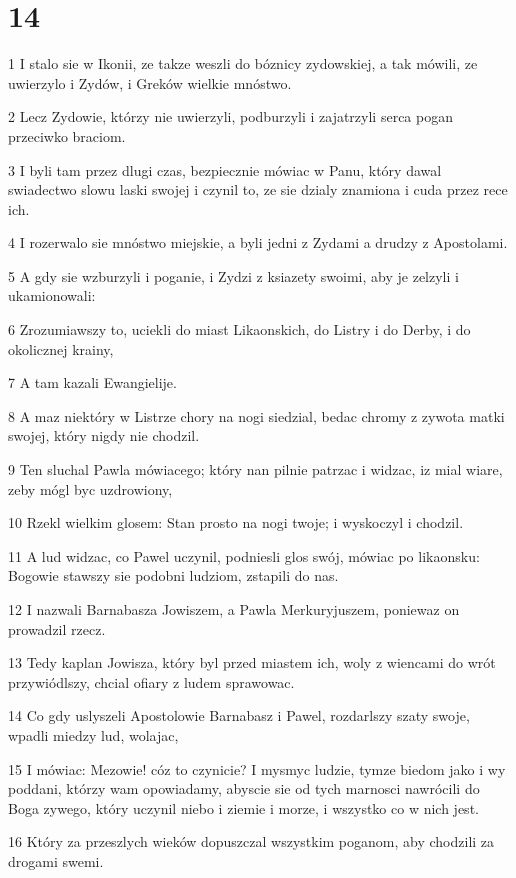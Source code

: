 \chapter{14}

\par 1 I stalo sie w Ikonii, ze takze weszli do bóznicy zydowskiej, a tak mówili, ze uwierzylo i Zydów, i Greków wielkie mnóstwo.
\par 2 Lecz Zydowie, którzy nie uwierzyli, podburzyli i zajatrzyli serca pogan przeciwko braciom.
\par 3 I byli tam przez dlugi czas, bezpiecznie mówiac w Panu, który dawal swiadectwo slowu laski swojej i czynil to, ze sie dzialy znamiona i cuda przez rece ich.
\par 4 I rozerwalo sie mnóstwo miejskie, a byli jedni z Zydami a drudzy z Apostolami.
\par 5 A gdy sie wzburzyli i poganie, i Zydzi z ksiazety swoimi, aby je zelzyli i ukamionowali:
\par 6 Zrozumiawszy to, uciekli do miast Likaonskich, do Listry i do Derby, i do okolicznej krainy,
\par 7 A tam kazali Ewangielije.
\par 8 A maz niektóry w Listrze chory na nogi siedzial, bedac chromy z zywota matki swojej, który nigdy nie chodzil.
\par 9 Ten sluchal Pawla mówiacego; który nan pilnie patrzac i widzac, iz mial wiare, zeby mógl byc uzdrowiony,
\par 10 Rzekl wielkim glosem: Stan prosto na nogi twoje; i wyskoczyl i chodzil.
\par 11 A lud widzac, co Pawel uczynil, podniesli glos swój, mówiac po likaonsku: Bogowie stawszy sie podobni ludziom, zstapili do nas.
\par 12 I nazwali Barnabasza Jowiszem, a Pawla Merkuryjuszem, poniewaz on prowadzil rzecz.
\par 13 Tedy kaplan Jowisza, który byl przed miastem ich, woly z wiencami do wrót przywiódlszy, chcial ofiary z ludem sprawowac.
\par 14 Co gdy uslyszeli Apostolowie Barnabasz i Pawel, rozdarlszy szaty swoje, wpadli miedzy lud, wolajac,
\par 15 I mówiac: Mezowie! cóz to czynicie? I mysmyc ludzie, tymze biedom jako i wy poddani, którzy wam opowiadamy, abyscie sie od tych marnosci nawrócili do Boga zywego, który uczynil niebo i ziemie i morze, i wszystko co w nich jest.
\par 16 Który za przeszlych wieków dopuszczal wszystkim poganom, aby chodzili za drogami swemi.
